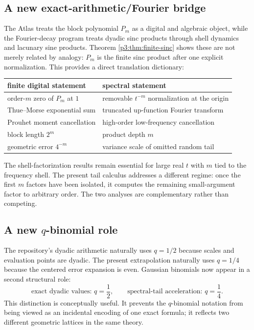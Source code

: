 \documentclass[11pt,oneside]{article}
\numberwithin{equation}{section}
\theoremstyle{definition}
\theoremstyle{remark}
\begin{document}
\subsection{A new exact-arithmetic/Fourier bridge}

The Atlas treats the block polynomial $P_m$ as a digital and algebraic object, while the
Fourier-decay program treats dyadic sinc products through shell dynamics and lacunary sine
products.  Theorem \ref{p3:thm:finite-sinc} shows these are not merely related by analogy:
$P_m$ is the finite sinc product after one explicit normalization.  This provides a direct
translation dictionary:
\begin{center}
\small
\begin{tabular}{@{}ll@{}}
\toprule
finite digital statement & spectral statement \\
\midrule
order-$m$ zero of $P_m$ at $1$ & removable $t^{-m}$ normalization at the origin\\
Thue--Morse exponential sum & truncated up-function Fourier transform\\
Prouhet moment cancellation & high-order low-frequency cancellation\\
block length $2^m$ & product depth $m$\\
geometric error $4^{-m}$ & variance scale of omitted random tail\\
\bottomrule
\end{tabular}
\end{center}

The shell-factorization results remain essential for large real $t$ with $m$ tied to the
frequency shell.  The present tail calculus addresses a different regime: once the first
$m$ factors have been isolated, it computes the remaining small-argument factor to arbitrary
order.  The two analyses are complementary rather than competing.

\subsection{A new $q$-binomial role}

The repository's dyadic arithmetic naturally uses $q=1/2$ because scales and evaluation
points are dyadic.  The present extrapolation naturally uses $q=1/4$ because the centered
error expansion is even.  Gaussian binomials now appear in a second structural role:
\begin{equation}
 \text{exact dyadic values: }q=\frac12,
 \qquad
 \text{spectral-tail acceleration: }q=\frac14.
 \label{p3:eq:two-q}
\end{equation}
This distinction is conceptually useful.  It prevents the $q$-binomial notation from being
viewed as an incidental encoding of one exact formula; it reflects two different geometric
lattices in the same theory.
\end{document}
